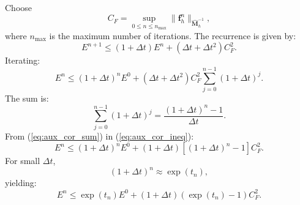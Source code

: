 \documentclass{article}
\newcommand{\M}{\hat{\mathbf{M}}_h}
\begin{document}
Choose
\begin{equation}
    \nonumber
    C_F = \sup \limits_{0 \leq n \leq n_{\max}} \| \mathbf{f}^n_h\|_{\M^{-1}}, 
\end{equation}
where $n_{\max}$ is the maximum number of iterations. The recurrence is given by:
\begin{equation}
    \nonumber
    E^{n+1} \leq (1+\Delta t)E^n + (\Delta t + \Delta t^2)C_F^2.
\end{equation}
Iterating:
\begin{equation}\label{eq:aux_cor_ineq}
    E^n \leq (1 + \Delta t)^n E^0 + (\Delta t + \Delta t^2) C_F^2 \sum \limits^{n-1}_{j=0}(1 + \Delta t)^j.
\end{equation}
The sum is:
\begin{equation}\label{eq:aux_cor_sum}
    \sum \limits^{n-1}_{j=0}(1 + \Delta t)^j = \frac{(1+\Delta t)^n-1}{\Delta t}.
\end{equation}
From (\ref{eq:aux_cor_sum}) in (\ref{eq:aux_cor_ineq}):
\begin{equation}
    \nonumber
    E^n \leq (1+\Delta t)^n E^0 + (1+\Delta t)[(1+\Delta t)^n -1]C_F^2.
\end{equation}
For small $\Delta t$, 
\begin{equation}
    \nonumber
    (1+\Delta t)^n \approx \exp (t_n),
\end{equation}
yielding:
\begin{equation}
    \nonumber
    E^n \leq \exp (t_n) E^0 + (1+ \Delta t)(\exp (t_n) - 1)C_F^2.
\end{equation}
\end{document}
